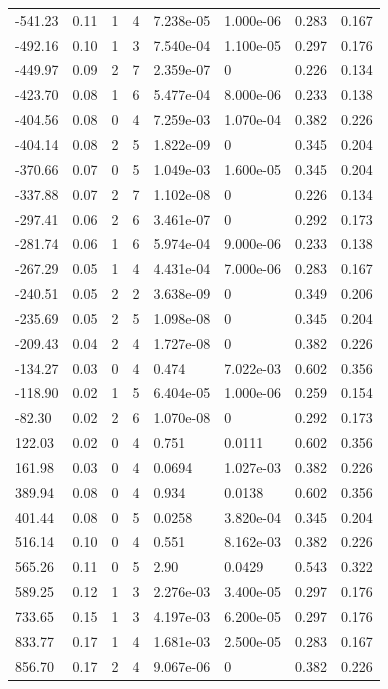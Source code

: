 \documentclass[preview]{standalone}
\begin{document}
{{\begin{tabular}{L{1.2cm}C{1.2cm} C{0.3cm}C{0.5cm} C{1.4cm}C{1.4cm} C{1.4cm}C{1.4cm}}
  -541.23  &  0.11  & 1     &  4 &  7.238e-05  & 1.000e-06  & 0.283 &  0.167   \\ 
  -492.16  &  0.10  & 1     &  3 &  7.540e-04  & 1.100e-05  & 0.297 &  0.176   \\ 
  -449.97  &  0.09  & 2     &  7 &  2.359e-07  & 0  & 0.226 &  0.134   \\ 
  -423.70  &  0.08  & 1     &  6 &  5.477e-04  & 8.000e-06  & 0.233 &  0.138   \\ 
  -404.56  &  0.08  & 0     &  4 &  7.259e-03  & 1.070e-04  & 0.382 &  0.226   \\ 
  -404.14  &  0.08  & 2     &  5 &  1.822e-09  & 0  & 0.345 &  0.204   \\ 
  -370.66  &  0.07  & 0     &  5 &  1.049e-03  & 1.600e-05  & 0.345 &  0.204   \\ 
  -337.88  &  0.07  & 2     &  7 &  1.102e-08  & 0  & 0.226 &  0.134   \\ 
  -297.41  &  0.06  & 2     &  6 &  3.461e-07  & 0  & 0.292 &  0.173   \\ 
  -281.74  &  0.06  & 1     &  6 &  5.974e-04  & 9.000e-06  & 0.233 &  0.138   \\ 
  -267.29  &  0.05  & 1     &  4 &  4.431e-04  & 7.000e-06  & 0.283 &  0.167   \\ 
  -240.51  &  0.05  & 2     &  2 &  3.638e-09  & 0  & 0.349 &  0.206   \\ 
  -235.69  &  0.05  & 2     &  5 &  1.098e-08  & 0  & 0.345 &  0.204   \\ 
  -209.43  &  0.04  & 2     &  4 &  1.727e-08  & 0  & 0.382 &  0.226   \\ 
  -134.27  &  0.03  & 0     &  4 &  0.474  & 7.022e-03  & 0.602 &  0.356   \\ 
  -118.90  &  0.02  & 1     &  5 &  6.404e-05  & 1.000e-06  & 0.259 &  0.154   \\ 
  -82.30  &  0.02  & 2     &  6 &  1.070e-08  & 0  & 0.292 &  0.173   \\ 
  122.03  &  0.02  & 0     &  4 &  0.751  & 0.0111  & 0.602 &  0.356   \\ 
  161.98  &  0.03  & 0     &  4 &  0.0694  & 1.027e-03  & 0.382 &  0.226   \\ 
  389.94  &  0.08  & 0     &  4 &  0.934  & 0.0138  & 0.602 &  0.356   \\ 
  401.44  &  0.08  & 0     &  5 &  0.0258  & 3.820e-04  & 0.345 &  0.204   \\ 
  516.14  &  0.10  & 0     &  4 &  0.551  & 8.162e-03  & 0.382 &  0.226   \\ 
  565.26  &  0.11  & 0     &  5 &  2.90  & 0.0429  & 0.543 &  0.322   \\ 
  589.25  &  0.12  & 1     &  3 &  2.276e-03  & 3.400e-05  & 0.297 &  0.176   \\ 
  733.65  &  0.15  & 1     &  3 &  4.197e-03  & 6.200e-05  & 0.297 &  0.176   \\ 
  833.77  &  0.17  & 1     &  4 &  1.681e-03  & 2.500e-05  & 0.283 &  0.167   \\ 
  856.70  &  0.17  & 2     &  4 &  9.067e-06  & 0  & 0.382 &  0.226   \\ 
\hline 
\end{tabular} 

}}
\end{document}
